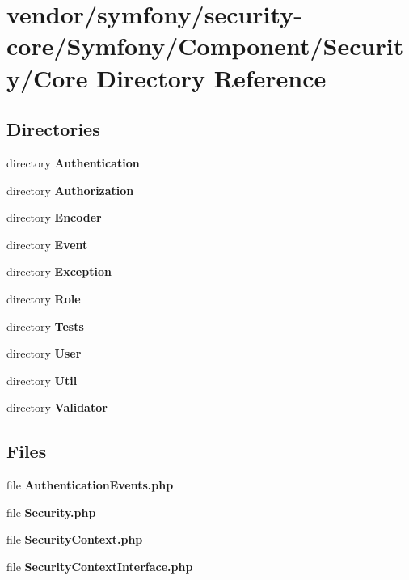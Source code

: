 \section{vendor/symfony/security-\/core/\+Symfony/\+Component/\+Security/\+Core Directory Reference}
\label{dir_0cb2acc91a6baeea2546b00122562284}
\subsection*{Directories}
\begin{DoxyCompactItemize}
\item 
directory {\bf Authentication}
\item 
directory {\bf Authorization}
\item 
directory {\bf Encoder}
\item 
directory {\bf Event}
\item 
directory {\bf Exception}
\item 
directory {\bf Role}
\item 
directory {\bf Tests}
\item 
directory {\bf User}
\item 
directory {\bf Util}
\item 
directory {\bf Validator}
\end{DoxyCompactItemize}
\subsection*{Files}
\begin{DoxyCompactItemize}
\item 
file {\bf Authentication\+Events.\+php}
\item 
file {\bf Security.\+php}
\item 
file {\bf Security\+Context.\+php}
\item 
file {\bf Security\+Context\+Interface.\+php}
\end{DoxyCompactItemize}
